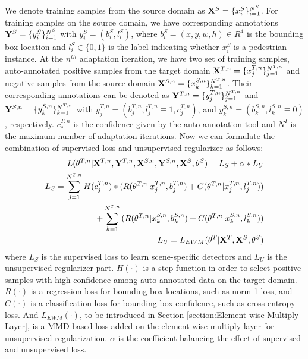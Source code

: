 \documentclass[runningheads]{llncs}
\begin{document}
We denote training samples from the source domain as ${\bf X}^{S} = \{x^{S}_{i}\}^{N^{S}}_{i=1}$. For training samples on the source domain, we have corresponding annotations ${\bf Y}^{S} = \{y^{S}_{i}\}^{N^{S}}_{i=1}$ with $y^{S}_{i} = (b^{S}_{i},l^{S}_{i})$, where $b^{S}_{i} = (x,y,w,h) \in R^{4}$ is the bounding box location and $l^{S}_{i} \in \{0,1\}$ is the label indicating whether $x^{S}_{i}$ is a pedestrian instance. At the $n^{th}$ adaptation iteration, we have two set of training samples, auto-annotated positive samples from the target domain ${\bf X}^{T,n} = \{x^{T,n}_{j}\}^{N^{T,n}}_{j=1}$ and negative samples from the source domain ${\bf X}^{S,n} = \{x^{S,n}_{k}\}^{N^{T,n}}_{k=1}$. Their corresponding annotations can be denoted as ${\bf Y}^{T,n} = \{y^{T,n}_{j}\}^{N^{T,n}}_{j=1}$ and ${\bf Y}^{S,n} = \{y^{S,n}_{k}\}^{N^{T,n}}_{k=1}$ with $y^{T,n}_{j} = (b^{T,n}_{j},l^{T,n}_{j}\equiv1,c^{T,n}_{j})$, and $y^{S,n}_{k} = (b^{S,n}_{k},l^{S,n}_{k}\equiv0)$, respectively. $c^{T,n}_{*}$ is the confidence given by the auto-annotation tool and $N^{I}$ is the maximum number of adaptation iterations. Now we can formulate the combination of supervised loss and unsupervised regularizer as follows:
\begin{eqnarray}
  L(\theta^{T,n}|{\bf X}^{T,n},{\bf Y}^{T,n},{\bf X}^{S,n},{\bf Y}^{S,n},{\bf X}^{S},\theta^{S}) = L_{S} + \alpha * L_{U} \\
 \nonumber  L_{S} = \sum^{N^{T,n}}_{j=1}{H(c^{T,n}_{j})* ( R(\theta^{T,n}|x^{T,n}_{j},b^{T,n}_{j})+C(\theta^{T,n}|x^{T,n}_{j},l^{T,n}_{j}) )} \\
             + \sum^{N^{T,n}}_{k=1}{( R(\theta^{T,n}|x^{S,n}_{k},b^{S,n}_{k})+C(\theta^{T,n}|x^{S,n}_{k},l^{S,n}_{k}) )}\\
  L_{U} = L_{EWM}(\theta^{T}|{\bf X}^{T},{\bf X}^{S},\theta^{S}) \label{Eq:lmmd}
\end{eqnarray}
where $L_{S}$ is the supervised loss to learn scene-specific detectors and $L_{U}$ is the unsupervised regularizer part. $H(\cdot)$ is a step function in order to select positive samples with high confidence among auto-annotated data on the target domain. $R(\cdot)$ is a regression loss for bounding box locations, such as norm-1 loss, and $C(\cdot)$ is a classification loss for bounding box confidence, such as cross-entropy loss. And $L_{EWM}(\cdot)$, to be introduced in Section \ref{section:Element-wise Multiply Layer}, is a MMD-based loss added on the element-wise multiply layer for unsupervised regularization. $\alpha$ is the coefficient balancing the effect of supervised and unsupervised loss.
\end{document}
